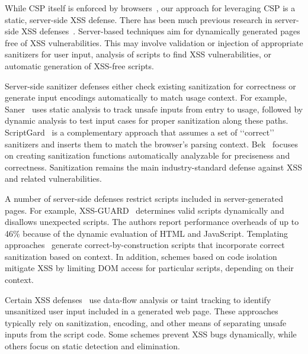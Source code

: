 While CSP itself is enforced by browsers~\cite{stamm10:csp}, our
approach for leveraging CSP is a static, server-side XSS defense.
There has been much previous research in server-side XSS
defenses~\cite{saxena11:scriptgard,balzarotti08:saner,samuel11:templating,google13:autoescape,bisht08:xssguard,nguyen05:hardening,pietraszek05,su06:sqlcheck,jovanovic06:pixy-improved,louw09:blueprint,vangundy09:noncespaces}.
Server-based techniques aim for dynamically generated pages free of
XSS vulnerabilities. This may involve validation or injection of
appropriate sanitizers for user input, analysis of scripts to find XSS
vulnerabilities, or automatic generation of XSS-free scripts.

Server-side sanitizer defenses either check existing sanitization for correctness or generate input encodings automatically to match usage context. For example, Saner~\cite{balzarotti08:saner} uses static analysis to track unsafe inputs from entry to usage, followed by dynamic analysis to test input cases for proper sanitization along these paths. {\sc ScriptGard}~\cite{saxena11:scriptgard} is a complementary approach that assumes a set of \lq\lq{}correct\rq\rq{} sanitizers and inserts them to match the browser\rq{}s parsing context.  {\sc Bek}~\cite{hooimeijer11:bek} focuses on creating sanitization functions automatically analyzable for preciseness and correctness.  Sanitization remains the main industry-standard defense against XSS and related vulnerabilities.

A number of server-side defenses restrict scripts included in
server-generated pages. For example, XSS-GUARD~\cite{bisht08:xssguard}
determines valid scripts dynamically and disallows unexpected scripts.
The authors report performance overheads of up to 46\%  because of the dynamic evaluation of HTML and JavaScript.
 Templating approaches~\cite{samuel11:templating,google13:autoescape,robertson09} generate correct-by-construction scripts that incorporate correct sanitization based on context. In addition, schemes based on code isolation~\cite{livshits07,athanasopoulos09,akhawe12:privilege} mitigate XSS by limiting DOM access for particular scripts, depending on their context.

Certain XSS
defenses~\cite{nguyen05:hardening,pietraszek05,xie06:static,jovanovic06:pixy-improved,martin08:autoxss,tripp09:taj,livshits05:java-static,johns07:smask,saxena10:kudzu}
use data-flow analysis or taint tracking to identify unsanitized user
input included in a generated web page. These approaches typically rely on
sanitization, encoding, and other means of separating unsafe inputs
from the script  code. Some schemes prevent XSS bugs dynamically, while others focus on static detection and elimination.

